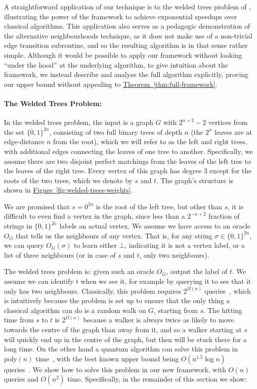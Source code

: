 \documentclass{article}
\newcommand{\thm}[1]{\hyperref[thm:#1]{Theorem~\ref*{thm:#1}}}
\newcommand{\fig}[1]{\hyperref[fig:#1]{Figure~\ref*{fig:#1}}}
\renewcommand{\>}{\rangle}
\newcommand{\<}{\langle}
\renewcommand{\(}{\left(}
\renewcommand{\)}{\right)}
\begin{document}
A straightforward application of our technique is to the welded trees problem of \cite{childs2003ExpSpeedupQW}, illustrating the power of the framework to achieve exponential speedups over classical algorithms. This application also serves as a pedagogic demonstration of the alternative neighbourhoods technique, as it does not make use of a non-trivial edge transition subroutine, and so the resulting algorithm is in that sense rather simple. Although it would be possible to apply our framework without looking ``under the hood'' at the underlying algorithm, to give intuition about the framework, we instead describe and analyse the full algorithm explicitly, proving our upper bound without appealing to \thm{full-framework}. 

\paragraph{The Welded Trees Problem:} In the welded trees problem, the input is a graph $G$ with $2^{n+2}-2$ vertices from the set $\{0,1\}^{2n}$, consisting of two full binary trees of depth $n$ (the $2^n$ leaves are at edge-distance $n$ from the root), which we will refer to as the left and right trees, with additional edges connecting the leaves of one tree to another. Specifically, we assume there are two disjoint perfect matchings from the leaves of the left tree to the leaves of the right tree. Every vertex of this graph has degree 3 except for the roots of the two trees, which we denote by $s$ and $t$. The graph's structure is shown in \fig{welded-trees-weights}.

We are promised that $s=0^{2n}$ is the root of the left tree, but other than $s$, it is difficult to even find a vertex in the graph, since less than a $2^{-n+2}$ fraction of strings in $\{0,1\}^{2n}$ labels an actual vertex. We assume we have access to an oracle $O_G$ that tells us the neighbours of any vertex.
That is, for any string $\sigma\in\{0,1\}^{2n}$, we can query $O_G(\sigma)$ to learn either $\bot$, indicating it is not a vertex label, or a list of three neighbours (or in case of $s$ and $t$, only two neighbours). 

The welded trees problem is: given such an oracle $O_G$, output the label of $t$. We assume we can identify $t$ when we see it, for example by querying it to see that it only has two neighbours. Classically, this problem requires $2^{\Omega(n)}$ queries~\cite{childs2003ExpSpeedupQW}, which is intuitively because the problem is set up to ensure that the only thing a classical algorithm can do is a random walk on $G$, starting from $s$. The hitting time from $s$ to $t$ is $2^{\Omega(n)}$ because a walker is always twice as likely to move towards the centre of the graph than away from it, and so a walker starting at $s$ will quickly end up in the centre of the graph, but then will be stuck there for a long time. 
On the other hand a quantum algorithm can solve this problem in poly$(n)$ time~\cite{childs2003ExpSpeedupQW}, with the best known upper bound being $O(n^{1.5}\log n)$ queries~\cite{atia2021welded}. We show how to solve this problem in our new framework, with $O(n)$ queries and ${O}(n^2)$ time. Specifically, in the remainder of this section we show:
\end{document}
